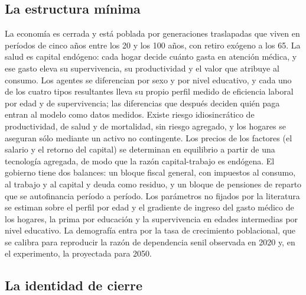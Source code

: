 \documentclass[12pt, letterpaper]{article}
\begin{document}
\subsection{La estructura mínima}

La economía es cerrada y está poblada por generaciones traslapadas que viven en
períodos de cinco años entre los 20 y los 100 años, con retiro exógeno a los 65. La
salud es capital endógeno: cada hogar decide cuánto gasta en atención médica, y
ese gasto eleva su supervivencia, su productividad y el valor que atribuye al
consumo. Los agentes se diferencian por sexo y por nivel educativo, y cada uno de
los cuatro tipos resultantes lleva su propio perfil medido de eficiencia laboral
por edad y de supervivencia; las diferencias que después deciden quién paga entran
al modelo como datos medidos. Existe riesgo idiosincrático de
productividad, de salud y de mortalidad, sin riesgo agregado, y los hogares se
aseguran sólo mediante un activo no contingente. Los precios de los factores (el
salario y el retorno del capital) se determinan en equilibrio a partir de
una tecnología agregada, de modo que la razón capital-trabajo es endógena. El
gobierno tiene dos balances: un bloque fiscal general, con impuestos al consumo, al
trabajo y al capital y deuda como residuo, y un bloque de pensiones de reparto que
se autofinancia período a período. Los parámetros no fijados por la literatura se
estiman sobre el perfil por edad y el gradiente de ingreso del gasto médico de los
hogares, la prima por educación y la supervivencia en edades intermedias por nivel
educativo. La demografía entra por la tasa de crecimiento poblacional, que se
calibra para reproducir la razón de dependencia senil observada en 2020 y, en el
experimento, la proyectada para 2050.

\subsection{La identidad de cierre}
\end{document}
